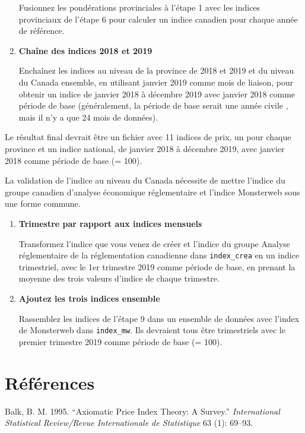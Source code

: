 \documentclass[]{article}
\begin{document}
\begin{enumerate}
  Fusionnez les pondérations provinciales à l'étape 1 avec les indices provinciaux de l'étape 6 pour calculer un indice canadien pour chaque année de référence.
\item
  \textbf{Chaîne des indices 2018 et 2019}

  Enchaînez les indices au niveau de la province de 2018 et 2019 et du niveau du Canada ensemble, en utilisant janvier 2019 comme mois de liaison, pour obtenir un indice de janvier 2018 à décembre 2019 avec janvier 2018 comme période de base (généralement, la période de base serait une année civile , mais il n'y a que 24 mois de données).
\end{enumerate}

Le résultat final devrait être un fichier avec 11 indices de prix, un pour chaque province et un indice national, de janvier 2018 à décembre 2019, avec janvier 2018 comme période de base (= 100).

La validation de l'indice au niveau du Canada nécessite de mettre l'indice du groupe canadien d'analyse économique réglementaire et l'indice Monsterweb sous une forme commune.

\begin{enumerate}
\def\labelenumi{\arabic{enumi}.}
\setcounter{enumi}{8}
\item
  \textbf{Trimestre par rapport aux indices mensuels}

  Transformez l'indice que vous venez de créer et l'indice du groupe Analyse réglementaire de la réglementation canadienne dans \texttt{index\_crea} en un indice trimestriel, avec le 1er trimestre 2019 comme période de base, en prenant la moyenne des trois valeurs d'indice de chaque trimestre.
\item
  \textbf{Ajoutez les trois indices ensemble}

  Rassemblez les indices de l'étape 9 dans un ensemble de données avec l'index de Monsterweb dans \texttt{index\_mw}. Ils devraient tous être trimestriels avec le premier trimestre 2019 comme période de base (= 100).
\end{enumerate}

\hypertarget{ruxe9fuxe9rences}{%
\section*{Références}\label{ruxe9fuxe9rences}}

\hypertarget{refs}{}
\leavevmode\hypertarget{ref-balk1995}{}%
Balk, B. M. 1995. ``Axiomatic Price Index Theory: A Survey.'' \emph{International Statistical Review/Revue Internationale de Statistique} 63 (1): 69--93.
\end{document}
